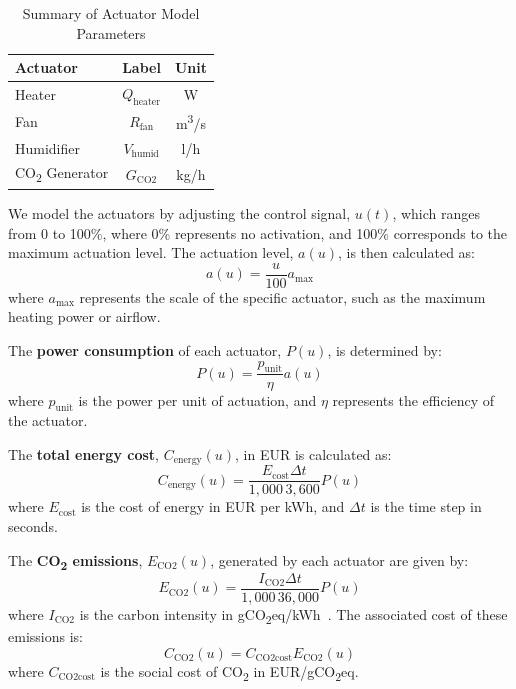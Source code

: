 \documentclass[conference]{IEEEtran}
\begin{document}
\begin{table}
    \centering
    \caption{Summary of Actuator Model Parameters}\label{tab:actuators}
    \begin{tabular}{lcc}
        \toprule
        Actuator                      & Label                   & Unit                   \\
        \midrule
        Heater                        & \( Q_{\text{heater}} \) & W                      \\
        Fan                           & \( R_{\text{fan}} \)    & m\textsuperscript{3}/s \\
        Humidifier                    & \( V_{\text{humid}} \)  & l/h                    \\
        CO\textsubscript{2} Generator & \( G_{\text{CO2}} \)    & kg/h                   \\
        \bottomrule
    \end{tabular}
\end{table}


We model the actuators by adjusting the control signal, \( u(t) \), which ranges from 0 to 100\%, where 0\% represents no activation, and 100\% corresponds to the maximum actuation level. The actuation level, \( a(u) \), is then calculated as:
\begin{equation}
    a(u) = \frac{u}{100}  a_{\text{max}}
\end{equation}
where \( a_{\text{max}} \) represents the scale of the specific actuator, such as the maximum heating power or airflow.

The \textbf{power consumption} of each actuator, \( P(u) \), is determined by:
\begin{equation}
    P(u) = \frac{p_{\text{unit}}}{\eta}  a(u)
\end{equation}
where \( p_{\text{unit}} \) is the power per unit of actuation, and \( \eta \) represents the efficiency of the actuator.

The \textbf{total energy cost}, \( C_{\text{energy}}(u) \), in EUR is calculated as:
\begin{equation}
    C_{\text{energy}}(u) = \frac{E_{\text{cost}}  \Delta t}{1,000 \, 3,600}  P(u)
\end{equation}
where \( E_{\text{cost}} \) is the cost of energy in EUR per kWh, and \( \Delta t \) is the time step in seconds.

The \textbf{CO\textsubscript{2} emissions}, \( E_{\text{CO2}}(u) \), generated by each actuator are given by:
\begin{equation}
    E_{\text{CO2}}(u) = \frac{I_{\text{CO2}}  \Delta t}{1,000  \, 36,000}  P(u)
\end{equation}
where \( I_{\text{CO2}} \) is the carbon intensity in gCO\textsubscript{2}eq/kWh~\cite{ElectricityMaps2022}. The associated cost of these emissions is:
\begin{equation}
    C_{\text{CO2}}(u) = C_{\text{CO2cost}}  E_{\text{CO2}}(u)
\end{equation}
where \( C_{\text{CO2cost}} \) is the social cost of CO\textsubscript{2} in EUR/gCO\textsubscript{2}eq.\\
\end{document}
